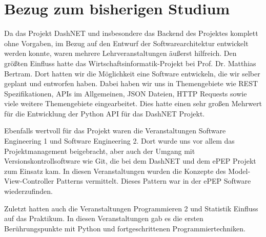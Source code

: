 \section{Bezug zum bisherigen Studium}
Da das Projekt DashNET und insbesondere das Backend des Projektes komplett ohne Vorgaben, im Bezug auf den Entwurf der Softwarearchitektur entwickelt werden konnte, waren mehrere Lehrveranstaltungen äußerst hilfreich. Den größten Einfluss hatte das Wirtschaftsinformatik-Projekt bei Prof. Dr. Matthias Bertram. Dort hatten wir die Möglichkeit eine Software entwickeln, die wir selber geplant und entworfen haben. Dabei haben wir uns in Themengebiete wie REST Spezifikationen, APIs im Allgemeinen, JSON Dateien, HTTP Requests sowie viele weitere Themengebiete eingearbeitet. Dies hatte einen sehr großen Mehrwert für die Entwicklung der Python API für das DashNET Projekt. 

Ebenfalls wertvoll für das Projekt waren die Veranstaltungen Software Engineering 1 und Software Engineering 2. Dort wurde uns vor allem das Projektmanagement beigebracht, aber auch der Umgang mit Versionskontrollsoftware wie Git, die bei dem DashNET und dem ePEP Projekt zum Einsatz kam. In diesen Veranstaltungen wurden die Konzepte des Model-View-Controller Patterns vermittelt. Dieses Pattern war in der ePEP Software wiederzufinden.  

Zuletzt hatten auch die Veranstaltungen Programmieren 2 und Statistik Einfluss auf das Praktikum. In diesen Veranstaltungen gab es die ersten Berührungspunkte mit Python und fortgeschrittenen Programmiertechniken.

